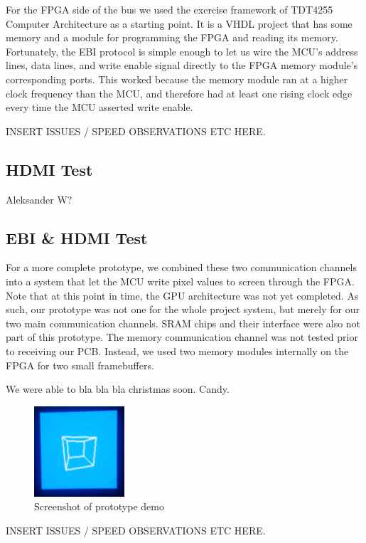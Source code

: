 For the FPGA side of the bus we used the exercise framework of TDT4255 Computer Architecture as a starting point.
It is a VHDL project that has some memory and a module for programming the FPGA and reading its memory.
Fortunately, the EBI protocol is simple enough to let us wire the MCU's address lines, data lines, and write enable signal directly to the FPGA memory module's corresponding ports.
This worked because the memory module ran at a higher clock frequency than the MCU, and therefore had at least one rising clock edge every time the MCU asserted write enable.

INSERT ISSUES / SPEED OBSERVATIONS ETC HERE.

\subsection{HDMI Test}
Aleksander W?

\subsection{EBI \& HDMI Test}
For a more complete prototype, we combined these two communication channels into a system that let the MCU write pixel values to screen through the FPGA.
Note that at this point in time, the GPU architecture was not yet completed.
As such, our prototype was not one for the whole project system, but merely for our two main communication channels.
SRAM chips and their interface were also not part of this prototype.
The memory communication channel was not tested prior to receiving our PCB.
Instead, we used two memory modules internally on the FPGA for two small framebuffers.

We were able to bla bla bla christmas soon.
Candy.

\begin{figure}
\centering
\includegraphics[width=0.3\textwidth]{diagrams/prototype_demo.png}
\caption{Screenshot of prototype demo}
\label{prototype_demo}
\end{figure}

INSERT ISSUES / SPEED OBSERVATIONS ETC HERE.
